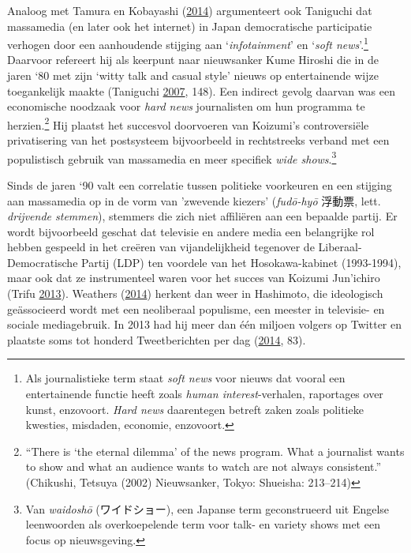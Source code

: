 \documentclass[10.5pt,dutch,]{article}
\begin{document}
Analoog met Tamura en Kobayashi
(\protect\hyperlink{ref-tamuraux5fnigglingux5f2014}{2014}) argumenteert
ook Taniguchi dat massamedia (en later ook het internet) in Japan
democratische participatie verhogen door een aanhoudende stijging aan
`\emph{infotainment}' en `\emph{soft news}'.\footnote{Als journalistieke
  term staat \emph{soft news} voor nieuws dat vooral een entertainende
  functie heeft zoals \emph{human interest}-verhalen, raportages over
  kunst, enzovoort. \emph{Hard news} daarentegen betreft zaken zoals
  politieke kwesties, misdaden, economie, enzovoort.} Daarvoor refereert
hij als keerpunt naar nieuwsanker Kume Hiroshi die in de jaren `80 met
zijn `witty talk and casual style' nieuws op entertainende wijze
toegankelijk maakte (Taniguchi
\protect\hyperlink{ref-taniguchiux5fchangingux5f2007}{2007}, 148). Een
indirect gevolg daarvan was een economische noodzaak voor \emph{hard
news} journalisten om hun programma te herzien.\footnote{``There is `the
  eternal dilemma' of the news program. What a journalist wants to show
  and what an audience wants to watch are not always consistent.''
  (Chikushi, Tetsuya (2002) Nieuwsanker, Tokyo: Shueisha: 213--214)} Hij
plaatst het succesvol doorvoeren van Koizumi's controversiële
privatisering van het postsysteem bijvoorbeeld in rechtstreeks verband
met een populistisch gebruik van massamedia en meer specifiek \emph{wide
shows}.\footnote{Van \emph{waidoshō} (ワイドショー), een Japanse term
  geconstrueerd uit Engelse leenwoorden als overkoepelende term voor
  talk- en variety shows met een focus op nieuwsgeving.}

Sinds de jaren `90 valt een correlatie tussen politieke voorkeuren en
een stijging aan massamedia op in de vorm van 'zwevende kiezers'
(\emph{fudō-hyō} 浮動票, lett. \emph{drijvende stemmen}), stemmers die
zich niet affiliëren aan een bepaalde partij. Er wordt bijvoorbeeld
geschat dat televisie en andere media een belangrijke rol hebben
gespeeld in het creëren van vijandelijkheid tegenover de
Liberaal-Democratische Partij (LDP) ten voordele van het
Hosokawa-kabinet (1993-1994), maar ook dat ze instrumenteel waren voor
het succes van Koizumi Jun'ichiro (Trifu
\protect\hyperlink{ref-trifuux5fprefecturalux5f2013}{2013}). Weathers
(\protect\hyperlink{ref-weathersux5freformerux5f2014}{2014}) herkent dan
weer in Hashimoto, die ideologisch geässocieerd wordt met een
neoliberaal populisme, een meester in televisie- en sociale
mediagebruik. In 2013 had hij meer dan één miljoen volgers op Twitter en
plaatste soms tot honderd Tweetberichten per dag
(\protect\hyperlink{ref-weathersux5freformerux5f2014}{2014}, 83).
\end{document}

